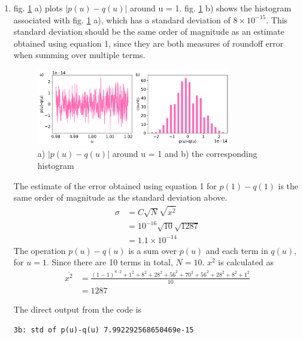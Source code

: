 \documentclass{article}
\newcommand{\code}{\texttt}
\begin{document}
\begin{enumerate}
\begin{enumerate}
    \item fig. \ref{fig:3b} a) plots $|p(u)-q(u)|$ around u = 1. fig. \ref{fig:3b} b) shows the histogram associated with fig. \ref{fig:3b} a), which has a standard deviation of $8\times10^{-15}$. This standard deviation should be the same order of magnitude as an estimate obtained using equation 1, since they are both measures of roundoff error when summing over multiple terms.

    \begin{figure}[h]
        \centering 
        \includegraphics[width=0.8\textwidth]{3b.pdf}
        \caption{a) $|p(u)-q(u)|$ around u = 1 and b) the corresponding histogram}
        \label{fig:3b}
    \end{figure}

    The estimate of the error obtained using equation 1 for $p(1)-q(1)$ is the same order of magnitude as the standard deviation above.
    \begin{align*}
        \sigma &= C\sqrt{N}\sqrt{\overline{x^2}}\\
        &= 10^{-16}\sqrt{10}\sqrt{1287}\\
        &= 1.1 \times 10^{-14}
    \end{align*}
    The operation $p(u)-q(u)$ is a sum over $p(u)$ and each term in $q(u)$, for $u=1$. Since there are 10 terms in total, $N=10$. $\overline{x^2}$ is calculated as 
    \begin{align*}
        \overline{x^2} &= \frac{(1-1)^{8\cdot 2} + 1^2 + 8^2 + 28^2 + 56^2 + 70^2 + 56^2 +28^2 + 8^2+ 1^2}{10}\\
        &= 1287
    \end{align*}

    The direct output from the code is 
    
    \code{3b: std of p(u)-q(u) 7.992292568650469e-15}
    

\end{enumerate}
\end{enumerate}
\end{document}
